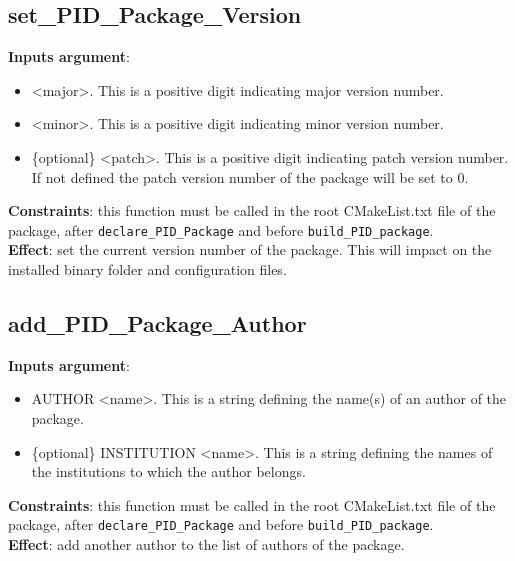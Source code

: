\documentclass[12pt,a4paper]{article}
\begin{document}
\subsection{set\_PID\_Package\_Version}

\textbf{Inputs argument}:
\begin{itemize}
\item <major>. This is a positive digit indicating major version number.
\item <minor>. This is a positive digit indicating minor version number.
\item \{optional\} <patch>. This is a positive digit indicating patch version number. If not defined the patch version number of the package will be set to 0.
\end{itemize}
\textbf{Constraints}: this function must be called in the root CMakeList.txt file of the package, after \texttt{declare\_PID\_Package} and before \texttt{build\_PID\_package}.\\
\textbf{Effect}: set the current version number of the package. This will impact on the installed binary folder and configuration files.

\subsection{add\_PID\_Package\_Author}

\textbf{Inputs argument}: 
\begin{itemize}
\item AUTHOR <name>. This is a string defining the name(s) of an author of the package.
\item \{optional\} INSTITUTION <name>. This is a string defining the names of the institutions to which the author belongs.
\end{itemize}
\textbf{Constraints}: this function must be called in the root CMakeList.txt file of the package, after \texttt{declare\_PID\_Package} and before \texttt{build\_PID\_package}.\\
\textbf{Effect}: add another author to the list of authors of the package.
\end{document}

